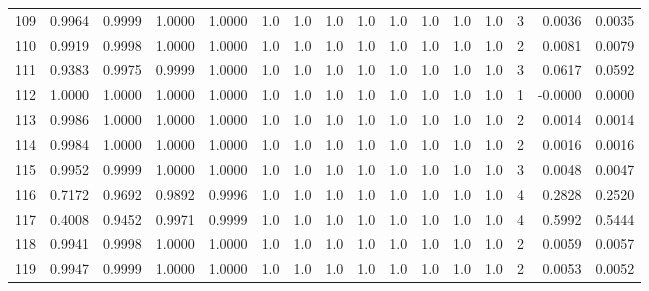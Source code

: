 \begin{tabular}{lrrrrrrrrrrrrrrr}
109 &      0.9964 &  0.9999 &  1.0000 &  1.0000 &     1.0 &     1.0 &     1.0 &     1.0 &     1.0 &     1.0 &      1.0 &        1.0 &      3 &                    0.0036 &                     0.0035 \\
110 &      0.9919 &  0.9998 &  1.0000 &  1.0000 &     1.0 &     1.0 &     1.0 &     1.0 &     1.0 &     1.0 &      1.0 &        1.0 &      2 &                    0.0081 &                     0.0079 \\
111 &      0.9383 &  0.9975 &  0.9999 &  1.0000 &     1.0 &     1.0 &     1.0 &     1.0 &     1.0 &     1.0 &      1.0 &        1.0 &      3 &                    0.0617 &                     0.0592 \\
112 &      1.0000 &  1.0000 &  1.0000 &  1.0000 &     1.0 &     1.0 &     1.0 &     1.0 &     1.0 &     1.0 &      1.0 &        1.0 &      1 &                   -0.0000 &                     0.0000 \\
113 &      0.9986 &  1.0000 &  1.0000 &  1.0000 &     1.0 &     1.0 &     1.0 &     1.0 &     1.0 &     1.0 &      1.0 &        1.0 &      2 &                    0.0014 &                     0.0014 \\
114 &      0.9984 &  1.0000 &  1.0000 &  1.0000 &     1.0 &     1.0 &     1.0 &     1.0 &     1.0 &     1.0 &      1.0 &        1.0 &      2 &                    0.0016 &                     0.0016 \\
115 &      0.9952 &  0.9999 &  1.0000 &  1.0000 &     1.0 &     1.0 &     1.0 &     1.0 &     1.0 &     1.0 &      1.0 &        1.0 &      3 &                    0.0048 &                     0.0047 \\
116 &      0.7172 &  0.9692 &  0.9892 &  0.9996 &     1.0 &     1.0 &     1.0 &     1.0 &     1.0 &     1.0 &      1.0 &        1.0 &      4 &                    0.2828 &                     0.2520 \\
117 &      0.4008 &  0.9452 &  0.9971 &  0.9999 &     1.0 &     1.0 &     1.0 &     1.0 &     1.0 &     1.0 &      1.0 &        1.0 &      4 &                    0.5992 &                     0.5444 \\
118 &      0.9941 &  0.9998 &  1.0000 &  1.0000 &     1.0 &     1.0 &     1.0 &     1.0 &     1.0 &     1.0 &      1.0 &        1.0 &      2 &                    0.0059 &                     0.0057 \\
119 &      0.9947 &  0.9999 &  1.0000 &  1.0000 &     1.0 &     1.0 &     1.0 &     1.0 &     1.0 &     1.0 &      1.0 &        1.0 &      2 &                    0.0053 &                     0.0052 \\

\end{tabular}
